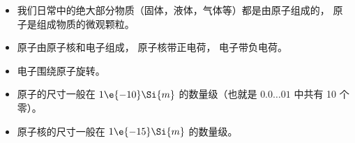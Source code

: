 
\begin{issues}
\issueDraft
\end{issues}

\begin{itemize}
\item 我们日常中的绝大部分物质（固体，液体，气体等）都是由原子组成的， 原子是组成物质的微观颗粒。
\item 原子由原子核和电子组成， 原子核带正电荷， 电子带负电荷。
\item 电子围绕原子旋转。
\item 原子的尺寸一般在 $1\e{-10}\Si{m}$ 的数量级（也就是 $0.0\dots01$ 中共有 10 个零）。
\item 原子核的尺寸一般在 $1\e{-15}\Si{m}$ 的数量级。
\end{itemize}
